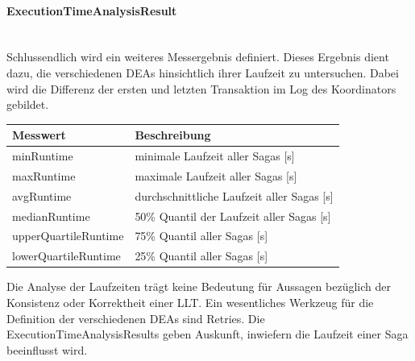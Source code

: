 \paragraph*{ExecutionTimeAnalysisResult} \mbox{}\\
Schlussendlich wird ein weiteres Messergebnis definiert. Dieses Ergebnis dient dazu, die verschiedenen DEAs hinsichtlich ihrer Laufzeit zu untersuchen. Dabei wird die Differenz der ersten und letzten Transaktion im Log des Koordinators gebildet. 

\begin{center}
	\begin{longtable}[h]{|p{5cm}|p{7.5cm}|}
		\hline
		Messwert & Beschreibung \\ \hline
		minRuntime & minimale Laufzeit aller Sagas [s]\\ \hline
		maxRuntime & maximale Laufzeit aller Sagas [s]\\ \hline
		avgRuntime & durchschnittliche Laufzeit aller Sagas [s]\\ \hline
		medianRuntime & 50\% Quantil der Laufzeit aller Sagas [s]\\ \hline
		upperQuartileRuntime & 75\% Quantil aller Sagas [s]\\ \hline
		lowerQuartileRuntime & 25\% Quantil aller Sagas [s]\\ \hline
\end{longtable}
\end{center}
\FloatBarrier

Die Analyse der Laufzeiten trägt keine Bedeutung für Aussagen bezüglich der Konsistenz oder Korrektheit einer LLT. Ein wesentliches Werkzeug für die Definition der verschiedenen DEAs sind Retries. Die ExecutionTimeAnalysisResults geben Auskunft, inwiefern die Laufzeit einer Saga beeinflusst wird.